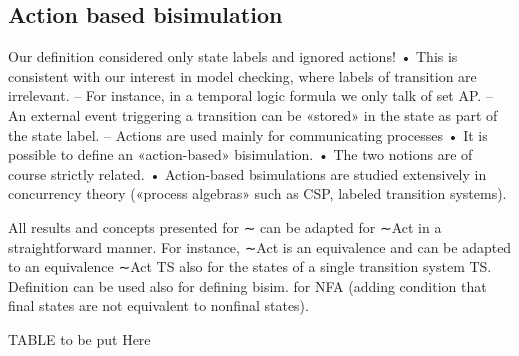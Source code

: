 \subsection{Action based bisimulation}
Our definition considered only state labels and ignored actions!
• This is consistent with our interest in model checking, where labels of transition are
irrelevant.
– For instance, in a temporal logic formula we only talk of set AP.
– An external event triggering a transition can be «stored» in the state as part of the state label.
– Actions are used mainly for communicating processes
• It is possible to define an «action-based» bisimulation.
• The two notions are of course strictly related.
• Action-based bsimulations are studied extensively in concurrency theory («process
algebras» such as CSP, labeled transition systems).
\begin{definition}
    
\end{definition}
All results and concepts presented for ∼ can be adapted for ∼Act in a straightforward manner. For instance,
∼Act is an equivalence and can be adapted to an equivalence ∼Act
TS also for the states of a single transition
system TS.
Definition can be used also for defining bisim. for NFA (adding condition that final states are not equivalent
to nonfinal states).




TABLE to be put Here